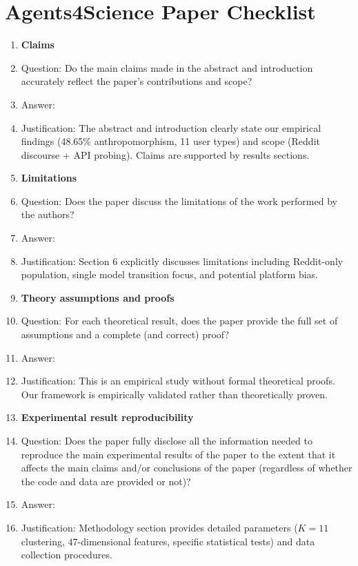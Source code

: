 \documentclass{article}
\begin{document}
\section*{Agents4Science Paper Checklist}

\begin{enumerate}

\item {\bf Claims}
    \item[] Question: Do the main claims made in the abstract and introduction accurately reflect the paper's contributions and scope?
    \item[] Answer: \answerYes{} 
    \item[] Justification: The abstract and introduction clearly state our empirical findings (48.65\% anthropomorphism, 11 user types) and scope (Reddit discourse + API probing). Claims are supported by results sections.

\item {\bf Limitations}
    \item[] Question: Does the paper discuss the limitations of the work performed by the authors?
    \item[] Answer: \answerYes{} 
    \item[] Justification: Section 6 explicitly discusses limitations including Reddit-only population, single model transition focus, and potential platform bias.

\item {\bf Theory assumptions and proofs}
    \item[] Question: For each theoretical result, does the paper provide the full set of assumptions and a complete (and correct) proof?
    \item[] Answer: \answerNA{} 
    \item[] Justification: This is an empirical study without formal theoretical proofs. Our framework is empirically validated rather than theoretically proven.

\item {\bf Experimental result reproducibility}
    \item[] Question: Does the paper fully disclose all the information needed to reproduce the main experimental results of the paper to the extent that it affects the main claims and/or conclusions of the paper (regardless of whether the code and data are provided or not)?
    \item[] Answer: \answerYes{} 
    \item[] Justification: Methodology section provides detailed parameters ($K=11$ clustering, $47$-dimensional features, specific statistical tests) and data collection procedures.


\end{enumerate}
\end{document}
